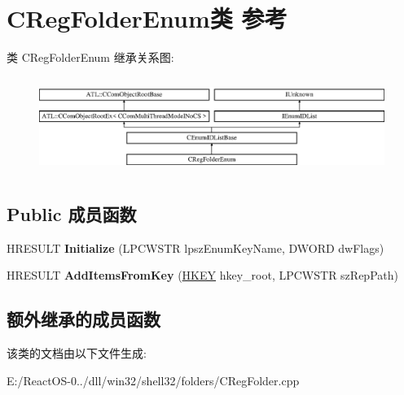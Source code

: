\hypertarget{class_c_reg_folder_enum}{}\section{C\+Reg\+Folder\+Enum类 参考}
\label{class_c_reg_folder_enum}
类 C\+Reg\+Folder\+Enum 继承关系图\+:\begin{figure}[H]
\begin{center}
\leavevmode
\includegraphics[height=3.181818cm]{class_c_reg_folder_enum}
\end{center}
\end{figure}
\subsection*{Public 成员函数}
\begin{DoxyCompactItemize}
\item 
\mbox{\label{class_c_reg_folder_enum_a0148cb23fd8afd2665c7b46a96a1752f}} 
H\+R\+E\+S\+U\+LT {\bfseries Initialize} (L\+P\+C\+W\+S\+TR lpsz\+Enum\+Key\+Name, D\+W\+O\+RD dw\+Flags)
\item 
\mbox{\label{class_c_reg_folder_enum_a586ac5a208fe7659ccc40edb346d9d83}} 
H\+R\+E\+S\+U\+LT {\bfseries Add\+Items\+From\+Key} (\hyperlink{interfacevoid}{H\+K\+EY} hkey\+\_\+root, L\+P\+C\+W\+S\+TR sz\+Rep\+Path)
\end{DoxyCompactItemize}
\subsection*{额外继承的成员函数}


该类的文档由以下文件生成\+:\begin{DoxyCompactItemize}
\item 
E\+:/\+React\+O\+S-\/0../dll/win32/shell32/folders/C\+Reg\+Folder.\+cpp\end{DoxyCompactItemize}
